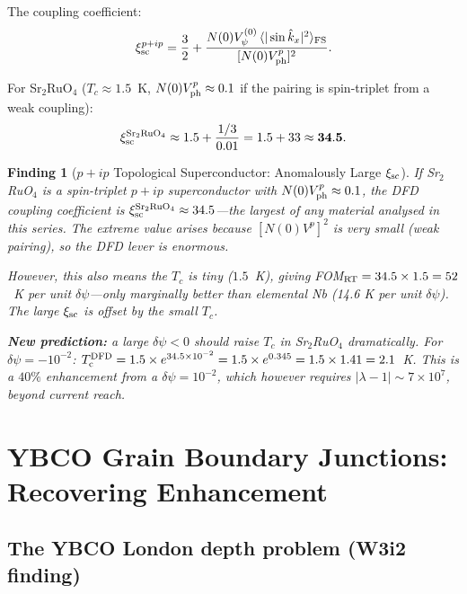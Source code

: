 \documentclass[11pt]{article}
\newtheorem{finding}{Finding}
\newcommand{\ee}[1]{\times 10^{#1}}
\newcommand{\Tc}{T_{\rm c}}
\begin{document}
The coupling coefficient:
\begin{equation}
\xi_{\rm sc}^{p+ip} = \frac{3}{2} + \frac{N(0)V_\psi^{(0)}\,\langle|\sin\hat{k}_x|^2\rangle_{\rm FS}}
  {[N(0)V_{\rm ph}^p]^2}.
\label{eq:xi-p+ip}
\end{equation}

For Sr$_2$RuO$_4$ ($T_c \approx 1.5$~K, $N(0)V_{\rm ph}^p \approx 0.1$
if the pairing is spin-triplet from a weak coupling):
\begin{equation}
\xi_{\rm sc}^{\rm Sr_2RuO_4} \approx 1.5 + \frac{1/3}{0.01}
= 1.5 + 33 \approx \mathbf{34.5}.
\label{eq:xi-Sr2RuO4}
\end{equation}

\begin{finding}[$p+ip$ Topological Superconductor: Anomalously Large $\xi_{\rm sc}$]
\label{finding:p+ip}
If Sr$_2$RuO$_4$ is a spin-triplet $p+ip$ superconductor with
$N(0)V_{\rm ph}^p \approx 0.1$, the DFD coupling coefficient is
$\xi_{\rm sc}^{\rm Sr_2RuO_4} \approx 34.5$---the largest of any material
analysed in this series. The extreme value arises because $[N(0)V^p]^2$
is very small (weak pairing), so the DFD lever is enormous.

However, this also means the $T_c$ is tiny ($1.5$~K), giving
FOM$_{\rm RT} = 34.5 \times 1.5 = 52$~K per unit $\delta\psi$---only
marginally better than elemental Nb (14.6 K per unit $\delta\psi$).
The large $\xi_{\rm sc}$ is offset by the small $T_c$.

\textbf{New prediction:} a large $\delta\psi < 0$ should raise $T_c$ in
Sr$_2$RuO$_4$ \emph{dramatically}. For $\delta\psi = -10^{-2}$:
$\Tc^{\rm DFD} = 1.5 \times e^{34.5 \times 10^{-2}} = 1.5 \times e^{0.345}
= 1.5 \times 1.41 = 2.1$~K. This is a $40\%$ enhancement from a
$\delta\psi = 10^{-2}$, which however requires $|\lambda-1| \sim 7\ee{7}$,
beyond current reach.
\end{finding}

\section{YBCO Grain Boundary Junctions: Recovering Enhancement}
\label{sec:grain-boundary}

\subsection{The YBCO London depth problem (W3i2 finding)}
\end{document}
